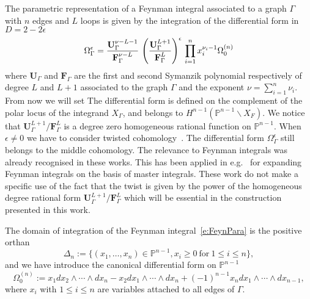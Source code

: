 \documentclass[a4paper,12pt]{article}
\numberwithin{equation}{section}
\numberwithin{figure}{subsection}
\theoremstyle{plain}
\theoremstyle{plain}
\theoremstyle{definition}
\theoremstyle{plain}
\theoremstyle{remark}
\theoremstyle{plain}
\begin{document}
The parametric representation of a Feynman integral associated to a
graph $\Gamma$ with $n$ edges and $L$ loops is given by the integration of the differential
form  in  $D=2-2\epsilon$
\begin{equation}
  \Omega^\epsilon_\Gamma={\textbf{U}_\Gamma^{\nu-L-1} \over \textbf{F}_\Gamma^{\nu-L}}\,
  \left(\textbf{U}_\Gamma^{L+1}\over \textbf{F}_\Gamma^L\right)^{\epsilon} \, \prod_{i=1}^n x_i^{\nu_i-1} \Omega^{(n)}_0  
\end{equation}
%
where $\textbf{U}_\Gamma$ and $\textbf{F}_\Gamma$ are the first and second Symanzik
polynomial respectively of degree $L$ and $L+1$ associated to the
graph $\Gamma$ and the exponent $\nu=\sum_{i=1}^n \nu_i$. From now we will set
The differential form is defined on the complement of the polar locus
of the integrand $X_\Gamma$, and belongs to $H^{n-1}( \mathbb
P^{n-1}\backslash X_F)$. We notice that   $\textbf{U}_\Gamma^{L+1}/\textbf{F}_\Gamma^L$ is a degree
zero homogeneous rational function on $\mathbb
P^{n-1}$. When $\epsilon\neq0$ we have to consider twisted
cohomology~\cite{Aomoto1,Aomoto,Aomoto_1982,AomotoBook}. The differential form
$\Omega_\Gamma^\epsilon$ still belongs to the middle cohomology. The
relevance to Feynman integrals was already recognised in these works. 
This has been applied in
e.g.~\cite{Mizera:2017rqa,Frellesvig:2019uqt,Cacciatori:2021nli}  for
expanding Feynman integrals on the basis of master integrals. These
work do not make a specific use of the fact that the twist is given by
the power of the homogeneous degree rational form
$\textbf{U}_\Gamma^{L+1}/\textbf{F}_\Gamma^L$ which will be essential
in the construction presented in this work.


The domain of integration of the Feynman integral~\eqref{e:FeynPara}  is the positive orthan
\begin{equation}\label{e:Deltan}
  \Delta_n:=\{(x_1,\dots,x_n)\in \mathbb P^{n-1}, x_i \geq0 ~\textrm{for}~ 1\leq
            i\leq n\},
          \end{equation}
          and we have introduce the canonical differential form on
          $\mathbb P^{n-1}$ 
\begin{equation}
 \Omega_0^{(n)}:=   x_1 dx_2\wedge \cdots \wedge dx_n- x_2
                dx_1\wedge\cdots \wedge dx_n+(-1)^{n-1}  x_n dx_1\wedge \cdots \wedge dx_{n-1}  ,
              \end{equation}
where $x_i$ with $1\leq i\leq n$  are  variables attached to all edges of
$\Gamma$.
\end{document}
